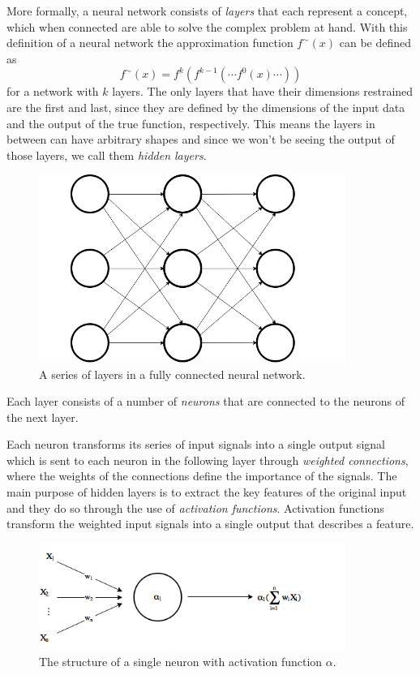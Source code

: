 \documentclass[11pt]{article}
\begin{document}
More formally, a neural network consists of \textit{layers} that each represent a concept, which
when connected are able to solve the complex problem at hand.
With this definition of a neural network the approximation function $f^{\sim}(x)$ can be
defined as
\begin{equation}
    f^{\sim}(x) = f^{k}(f^{k-1}( \cdots f^{0}(x) \cdots))
\end{equation}
for a network with $k$ layers.
The only layers that have their dimensions restrained are the first and last, since they are defined by the
dimensions of the input data and the output of the true function, respectively.
This means the layers in between can have arbitrary shapes and
since we won't be seeing the output of those layers, we call them \textit{hidden layers}.
\begin{figure}[!h]
    \centering
    \includegraphics[width=10cm]{include/layers.png}
    \caption{A series of layers in a fully connected neural network.}
    \label{fig:layers}
\end{figure}
Each layer consists of a number of \textit{neurons} that are connected to the neurons of the
next layer.

Each neuron transforms its series of input signals into a single output signal which is sent to
each neuron in the following layer through \textit{weighted connections}, where
the weights of the connections define the importance of the signals.
The main purpose of hidden layers is to extract the key features of the original input
and they do so through the use of \textit{activation functions}.
Activation functions transform the weighted input signals into a single output that
describes a feature.
\begin{figure}[!h]
    \centering
    \includegraphics[width=10cm]{include/neuron.png}
    \caption{The structure of a single neuron with activation function $\alpha$.}
    \label{fig:neuron}
\end{figure}
\end{document}
